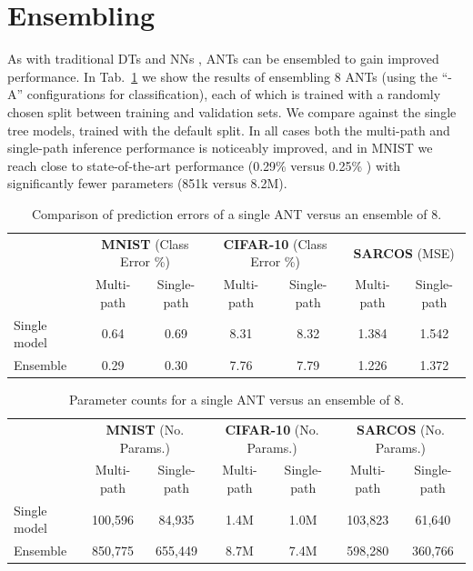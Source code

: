 \vspace{-5mm}
\section{Ensembling}\label{sec:supp_ensembling}
\vspace{-2mm}
As with traditional DTs \citep{breiman2001random} and NNs \citep{hansen1990neural}, ANTs can be ensembled to gain improved performance. In Tab.~\ref{tab:ensembling} we show the results of ensembling 8 ANTs (using the ``-A'' configurations for classification), each of which is trained with a randomly chosen split between training and validation sets. We compare against the single tree models, trained with the default split. In all cases both the multi-path and single-path inference performance is noticeably improved, and in MNIST we reach close to state-of-the-art performance (0.29\% versus 0.25\% \citep{sabour2017dynamic}) with significantly fewer parameters (851k versus 8.2M).
\vspace{-4mm}
\begin{table}[ht]
	\caption{\small Comparison of prediction errors of a single ANT versus an ensemble of 8. \label{tab:ensembling}}
	\footnotesize
    \center
	\begin{tabular}{|l|cc|cc|cc|}
		\hline
		\multicolumn{1}{|c}{} &  \multicolumn{2}{|c|}{\textbf{MNIST} (Class Error \%)} &  \multicolumn{2}{|c|}{\textbf{CIFAR-10} (Class Error \%)} & \multicolumn{2}{c|}{\textbf{SARCOS} (MSE)}  \\
			& Multi-path & Single-path  & Multi-path & Single-path & Multi-path & Single-path   \\
		\hline
	    Single model & 0.64 & 0.69 & 8.31  & 8.32 & 1.384  & 1.542 \\	
        Ensemble & 0.29 & 0.30 & 7.76 & 7.79 & 1.226 & 1.372  \\
		\hline
	\end{tabular}
	\vspace{-4mm}
\end{table}

\begin{table}[ht]
	\caption{\small Parameter counts for a single ANT versus an ensemble of 8. \label{tab:ensembling_params}}
	\center
    \vspace{-1mm}
    \footnotesize
    \begin{tabular}{|l|cc|cc|cc|}
		\hline
		\multicolumn{1}{|c}{} &  \multicolumn{2}{|c|}{\textbf{MNIST} (No. Params.)} &  \multicolumn{2}{|c|}{\textbf{CIFAR-10} (No. Params.)} & \multicolumn{2}{c|}{\textbf{SARCOS}  (No. Params.)}  \\
			& Multi-path & Single-path  & Multi-path & Single-path & Multi-path & Single-path   \\
		\hline
	    Single model & 100,596 & 84,935 & 1.4M & 1.0M & 103,823 & 61,640 \\	
        Ensemble & 850,775 & 655,449 & 8.7M & 7.4M & 598,280 & 360,766  \\
		\hline
	\end{tabular}
	
	\vspace{-5mm}
\end{table}

